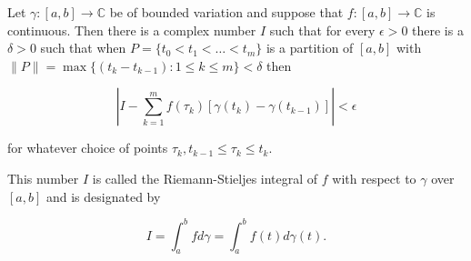 Let $\gamma: [a, b] \to \mathbb{C}$ be of bounded variation and suppose that $f: [a, b] \to \mathbb{C}$ is continuous. Then there is a complex number $I$ such that for every $\epsilon > 0$ there is a $\delta > 0$ such that when $P = \{t_0 < t_1 < \ldots < t_m\}$ is a partition of $[a, b]$ with $\|P\| = \max \{(t_k - t_{k-1}): 1 \leq k \leq m\} < \delta$ then

$$\left| I - \sum_{k=1}^{m} f(\tau_k) [\gamma(t_k) - \gamma(t_{k-1})] \right| < \epsilon$$

for whatever choice of points $\tau_k, t_{k-1} \leq \tau_k \leq t_k$.

This number $I$ is called the Riemann-Stieljes integral of $f$ with respect to $\gamma$ over $[a, b]$ and is designated by

$$I = \int_{a}^{b} f d\gamma = \int_{a}^{b} f(t) d\gamma(t).$$